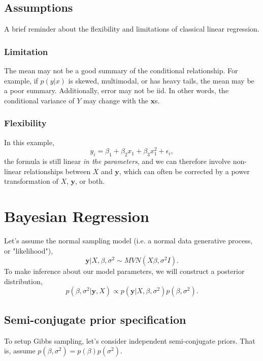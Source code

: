 \documentclass[titlepage, 12pt, leqno]{article}
\begin{document}
\subsection{Assumptions}
A brief reminder about the flexibility and limitations of classical linear
regression. 

\subsubsection{Limitation}
The mean may not be a good summary of the conditional relationship. For example,
if $p(y|x)$ is skewed, multimodal, or has heavy tails, the mean may be a poor
summary. Additionally, error may not be iid. In other words, the conditional
variance of $Y$ may change with the $\textbf{x}$s.

\subsubsection{Flexibility}
In this example,
\[
y_{i} = \beta_{1} + \beta_{2}x_{1} + \beta_{3}x_{1}^{2} + \epsilon_{i},
\]
the formula is still linear \textit{in the parameters}, and we can therefore
involve non-linear relationships between $X$ and $\textbf{y}$, which can 
often be corrected by a power transformation of $X$, $\textbf{y}$, or both.

\pagebreak
\section{Bayesian Regression}

Let's assume the normal sampling model (i.e. a normal data generative process,
or "likelihood"),
\[
\textbf{y}|X,\beta,\sigma^{2} \sim MVN(X\beta,\sigma^{2}I).
\]
To make inference about our model parameters, we will construct a posterior
distribution,
\[
p(\beta,\sigma^{2}|\textbf{y}, X) \propto p(\textbf{y}|X,\beta,\sigma^{2})
p(\beta,\sigma^{2}).
\]
\subsection{Semi-conjugate prior specification}
To setup Gibbs sampling, let's consider independent semi-conjugate priors. That
is, assume $p(\beta,\sigma^{2})=p(\beta)p(\sigma^{2})$.
\end{document}
